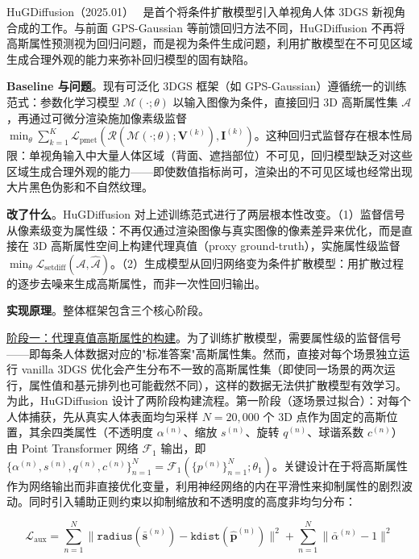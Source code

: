 HuGDiffusion（2025.01）~\cite{2501_15008} 是首个将条件扩散模型引入单视角人体 3DGS 新视角合成的工作。与前面 GPS-Gaussian 等前馈回归方法不同，HuGDiffusion 不再将高斯属性预测视为回归问题，而是视为条件生成问题，利用扩散模型在不可见区域生成合理外观的能力来弥补回归模型的固有缺陷。

\textbf{Baseline 与问题}。现有可泛化 3DGS 框架（如 GPS-Gaussian）遵循统一的训练范式：参数化学习模型 $\mathcal{M}(\cdot;\theta)$ 以输入图像为条件，直接回归 3D 高斯属性集 $\mathcal{A}$，再通过可微分渲染施加像素级监督 $\min_\theta \sum_{k=1}^{K} \mathcal{L}_\text{pmet}(\mathcal{R}(\mathcal{M}(\cdot;\theta); \mathbf{V}^{(k)}), \mathbf{I}^{(k)})$。这种回归式监督存在根本性局限：单视角输入中大量人体区域（背面、遮挡部位）不可见，回归模型缺乏对这些区域生成合理外观的能力——即使数值指标尚可，渲染出的不可见区域也经常出现大片黑色伪影和不自然纹理。

\textbf{改了什么}。HuGDiffusion 对上述训练范式进行了两层根本性改变。（1）监督信号从像素级变为属性级：不再仅通过渲染图像与真实图像的像素差异来优化，而是直接在 3D 高斯属性空间上构建代理真值（proxy ground-truth），实施属性级监督 $\min_\theta \mathcal{L}_\text{setdiff}(\mathcal{A}, \hat{\mathcal{A}})$。（2）生成模型从回归网络变为条件扩散模型：用扩散过程的逐步去噪来生成高斯属性，而非一次性回归输出。

\textbf{实现原理}。整体框架包含三个核心阶段。

\underline{阶段一：代理真值高斯属性的构建}。为了训练扩散模型，需要属性级的监督信号——即每条人体数据对应的"标准答案"高斯属性集。然而，直接对每个场景独立运行 vanilla 3DGS 优化会产生分布不一致的高斯属性集（即使同一场景的两次运行，属性值和基元排列也可能截然不同），这样的数据无法供扩散模型有效学习。为此，HuGDiffusion 设计了两阶段构建流程。第一阶段（逐场景过拟合）：对每个人体捕获，先从真实人体表面均匀采样 $N = 20{,}000$ 个 3D 点作为固定的高斯位置，其余四类属性（不透明度 $\alpha^{(n)}$、缩放 $s^{(n)}$、旋转 $q^{(n)}$、球谐系数 $c^{(n)}$）由 Point Transformer 网络 $\mathcal{F}_1$ 输出，即 $\{\alpha^{(n)}, s^{(n)}, q^{(n)}, c^{(n)}\}_{n=1}^{N} = \mathcal{F}_1(\{p^{(n)}\}_{n=1}^{N}; \theta_1)$。关键设计在于将高斯属性作为网络输出而非直接优化变量，利用神经网络的内在平滑性来抑制属性的剧烈波动。同时引入辅助正则约束以抑制缩放和不透明度的高度非均匀分布：

\begin{equation}
\mathcal{L}_\text{aux} = \sum_{n=1}^{N}\|\mathtt{radius}(\bar{\mathbf{s}}^{(n)}) - \mathtt{kdist}(\hat{\mathbf{p}}^{(n)})\|^2 + \sum_{n=1}^{N}\|\bar{\alpha}^{(n)} - 1\|^2
\end{equation}

